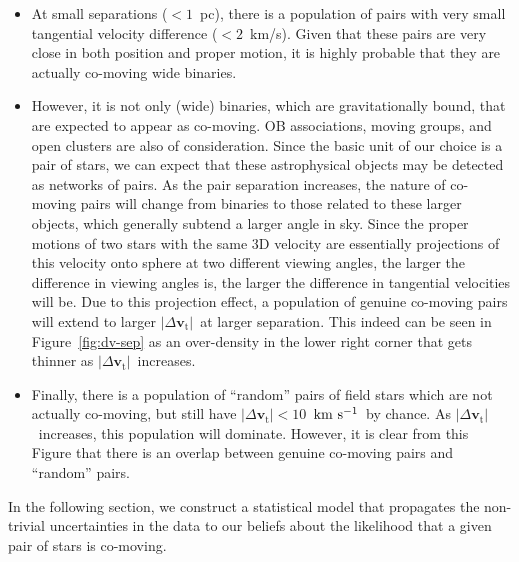 \documentclass[manuscript, letterpaper]{aastex6}
\newcommand{\bs}[1]{\boldsymbol{#1}}
\renewcommand{\vec}[1]{\bs{#1}}
\newcommand{\kms}{\ensuremath{\rm km~s^{-1}}}
\newcommand{\absdvtan}{\ensuremath{|\Delta\vec v_\mathrm{t}|}}
\begin{document}
\begin{itemize}
  \item At small separations ($<1$~pc), there is a population of pairs with
  very small tangential velocity difference ($<2$~km/s). Given that these pairs
  are very close in both position and proper motion,
  it is highly probable that they are actually co-moving wide binaries.

  \item  However, it is not only (wide) binaries, which are gravitationally
  bound, that are expected to appear as co-moving.
  OB associations, moving groups, and open clusters are also of consideration.
  Since the basic unit of our choice is a pair of stars, we can expect that
  these astrophysical objects may be detected as networks of pairs.
  As the pair separation increases, the nature of co-moving pairs
  will change from binaries to those related to these larger objects,
  which generally subtend a larger angle in sky.
  Since the proper motions of two stars with the same 3D velocity
  are essentially projections of this velocity onto sphere at
  two different viewing angles,
  the larger the difference in viewing angles is, the larger the difference in tangential
  velocities will be.
  Due to this projection effect, a population of genuine co-moving pairs
  will extend to larger \absdvtan\ at larger separation.
  This indeed can be seen in Figure~\ref{fig:dv-sep} as an over-density
  in the lower right corner that gets thinner as \absdvtan\ increases.

  \item Finally, there is a population of “random” pairs of field stars
  which are not actually co-moving, but still have $\absdvtan < 10$~\kms\
  by chance.
  As \absdvtan\ increases, this population will dominate.
  However, it is clear from this Figure that there is an overlap between
  genuine co-moving pairs and “random” pairs.
\end{itemize}

In the following section, we construct a statistical model that propagates
the non-trivial uncertainties in the data to our beliefs about the likelihood
that a given pair of stars is co-moving.
\end{document}
